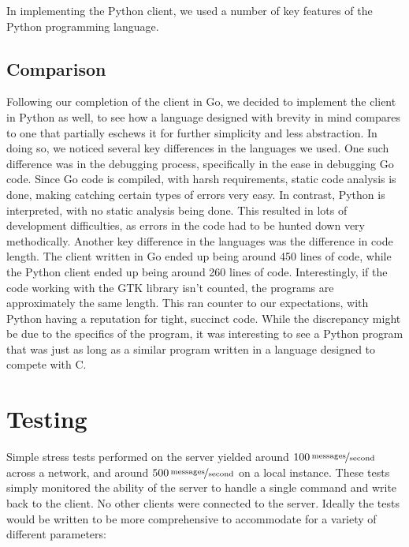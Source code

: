 \documentclass[12pt, letterpaper]{article}
\begin{document}

In implementing the Python client, we used a number of key features
of the Python programming language.

\subsection*{Comparison}

Following our completion of the client in Go, we decided to implement the
client in Python as well, to see how a language designed with brevity
in mind compares to one that partially eschews it for further simplicity
and less abstraction. In doing so, we noticed several key differences
in the languages we used. One such difference was in the debugging process,
specifically in the ease in debugging Go code. Since Go code is compiled,
with harsh requirements, static code analysis is done, making catching
certain types of errors very easy. In contrast, Python is interpreted,
with no static analysis being done. This resulted in lots of development
difficulties, as errors in the code had to be hunted down very methodically.
Another key difference in the languages was the difference in code length.
The client written in Go ended up being around
450 %
lines of code, while the Python client ended up being around
260  %
lines of code. Interestingly, if the code working with the GTK library isn't
counted, the programs are approximately the same length. This ran counter
to our expectations, with Python having a reputation for tight, succinct code.
While the discrepancy might be due to the specifics of the program, it was
interesting to see a Python program that was just as long as a similar program
written in a language designed to compete with C.

\section*{Testing}

Simple stress tests performed on the server yielded around
$\unitfrac[100]{messages}{second}$ 
across a network, and around
$\unitfrac[500]{messages}{second}$
on a 
local instance. These tests simply monitored the ability of the server 
to handle a single command and write back to the client. No other 
clients were connected to the server. Ideally the tests would be 
written to be more comprehensive to accommodate for a variety of 
different parameters:
\end{document}
